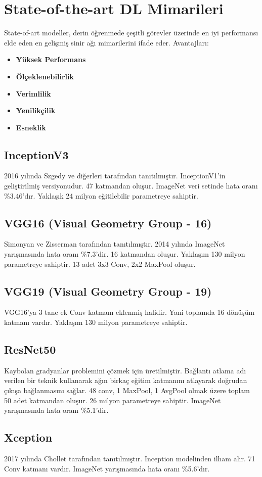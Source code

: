 \section{State-of-the-art DL Mimarileri}
State-of-art modeller, derin öğrenmede çeşitli görevler üzerinde en iyi performansı elde eden en gelişmiş sinir ağı mimarilerini ifade eder. Avantajları:
\begin{itemize}
	\item \textbf{Yüksek Performans}
	\item \textbf{Ölçeklenebilirlik}
	\item \textbf{Verimlilik}
	\item \textbf{Yenilikçilik}
	\item \textbf{Esneklik}
\end{itemize}

\subsection{InceptionV3}
2016 yılında Szgedy ve diğerleri tarafından tanıtılmıştır. InceptionV1'in geliştirilmiş versiyonudur. 47 katmandan oluşur. ImageNet veri setinde hata oranı \%3.46'dır. Yaklaşık 24 milyon eğitilebilir parametreye sahiptir.

\subsection{VGG16 (Visual Geometry Group - 16)}
Simonyan ve Zisserman tarafından tanıtılmıştır. 2014 yılında ImageNet yarışmasında hata oranı \%7.3'dir. 16 katmandan oluşur. Yaklaşım 130 milyon parametreye sahiptir. 13 adet 3x3 Conv, 2x2 MaxPool oluşur. 

\subsection{VGG19 (Visual Geometry Group - 19)}
VGG16'ya 3 tane ek Conv katmanı eklenmiş halidir. Yani toplamda 16 dönüşüm katmanı vardır. Yaklaşım 130 milyon parametreye sahiptir.

\subsection{ResNet50}
Kaybolan gradyanlar problemini çözmek için üretilmiştir. Bağlantı atlama adı verilen bir teknik kullanarak ağın birkaç eğitim katmanını atlayarak doğrudan çıkışa bağlanmasını sağlar.
48 conv, 1 MaxPool, 1 AvgPool olmak üzere toplam 50 adet katmandan oluşur. 26 milyon parametreye sahiptir. ImageNet yarışmasında hata oranı \%5.1'dir. 

\subsection{Xception}
2017 yılında Chollet tarafından tanıtılmıştır. Inception modelinden ilham alır. 71 Conv katmanı vardır. ImageNet yarışmasında hata oranı \%5.6'dır.

\newpage